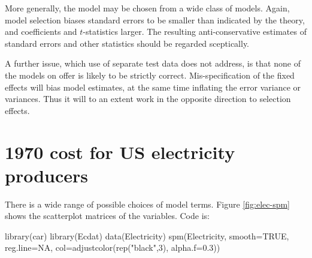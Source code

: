 More generally, 
the model may be chosen from a wide class of models.
Again, model selection biases standard errors to be smaller than
indicated by the theory, and coefficients and $t$-statistics larger.
The resulting anti-conservative estimates of standard errors and
other statistics should be regarded
sceptically. 

A further issue, which use of separate test data does not
  address, is that none of the models on offer is likely to be
  strictly correct. Mis-specification of the fixed effects will bias
  model estimates, at the same time inflating the error variance or
  variances.  Thus it will to an extent work in the opposite direction
  to selection effects.

\section{1970 cost for US electricity producers}\label{ss:elec}

There is a wide range of possible choices of model terms.
Figure \ref{fig:elec-spm} shows the scatterplot matrices of the
variables. Code is:
\begin{Schunk}
\begin{Sinput}
library(car)
library(Ecdat)
data(Electricity)
spm(Electricity, smooth=TRUE, reg.line=NA,
    col=adjustcolor(rep("black",3), alpha.f=0.3))
\end{Sinput}
\end{Schunk}

